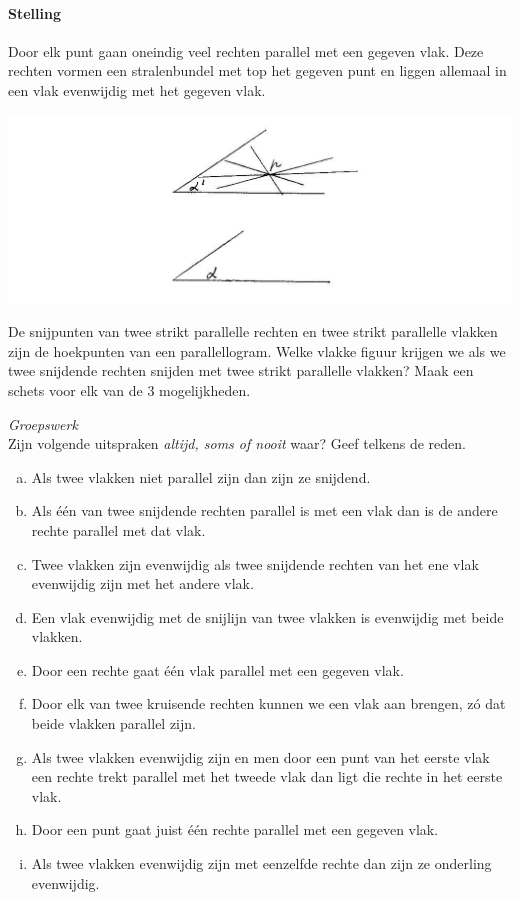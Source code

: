 \documentclass[12pt,twoside]{article}
\begin{document}
\paragraph*{Stelling}
Door elk punt gaan oneindig veel rechten parallel met een gegeven vlak.
Deze rechten vormen een stralenbundel met top het gegeven punt en liggen allemaal in een
vlak evenwijdig met het gegeven vlak.
\begin{center}
  \includegraphics[width=\textwidth]{stelling_17}
\end{center}


\begin{oefening}
De snijpunten van twee strikt parallelle rechten en twee strikt parallelle vlakken zijn
de hoekpunten van een parallellogram. Welke vlakke figuur krijgen we als we twee
snijdende rechten snijden met twee strikt parallelle vlakken? Maak een schets voor
elk van de 3 mogelijkheden.
\end{oefening}

\begin{oefening} {\em Groepswerk}\\
Zijn volgende uitspraken {\em altijd, soms of nooit} waar? Geef telkens de reden.
\begin{enumerate}[(a)]
  \item Als twee vlakken niet parallel zijn dan zijn ze snijdend.
  \item Als één van twee snijdende rechten parallel is met een vlak dan is de andere rechte parallel met dat vlak.
  \item Twee vlakken zijn evenwijdig als twee snijdende rechten van het ene vlak evenwijdig zijn met het andere vlak.
  \item Een vlak evenwijdig met de snijlijn van twee vlakken is evenwijdig met beide vlakken.
  \item Door een rechte gaat één vlak parallel met een gegeven vlak.
  \item Door elk van twee kruisende rechten kunnen we een vlak aan brengen, zó dat beide vlakken parallel zijn.
  \item Als twee vlakken evenwijdig zijn en men door een punt van het eerste vlak een rechte trekt parallel met het tweede vlak dan ligt die rechte in het eerste vlak.
  \item Door een punt gaat juist één rechte parallel met een gegeven vlak.
  \item Als twee vlakken evenwijdig zijn met eenzelfde rechte dan zijn ze onderling evenwijdig.
\end{enumerate}
\end{oefening}
\end{document}
